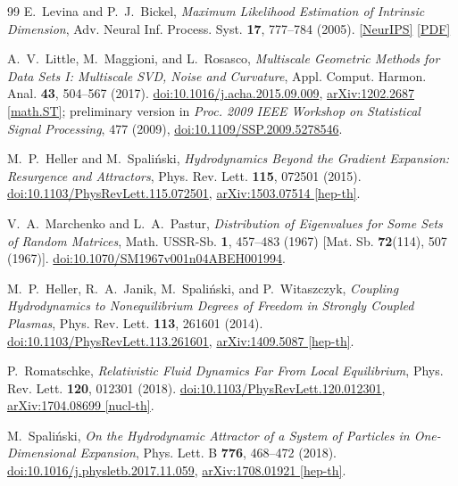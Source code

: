 \documentclass[11pt,a4paper]{article}
\begin{document}
\begin{thebibliography}{99}
E.~Levina and P.~J.~Bickel,
\emph{Maximum Likelihood Estimation of Intrinsic Dimension},
Adv. Neural Inf. Process. Syst. \textbf{17}, 777--784 (2005).
\href{https://proceedings.neurips.cc/paper_files/paper/2004/hash/74fbc16c530eb106688f1acbcb44fbee-Abstract.html}{[NeurIPS]}
\href{https://www.stat.berkeley.edu/~bickel/mldim.pdf}{[PDF]}

A.~V.~Little, M.~Maggioni, and L.~Rosasco,
\emph{Multiscale Geometric Methods for Data Sets I: Multiscale SVD, Noise and Curvature},
Appl. Comput. Harmon. Anal. \textbf{43}, 504--567 (2017).
\href{https://doi.org/10.1016/j.acha.2015.09.009}{doi:10.1016/j.acha.2015.09.009},
\href{https://arxiv.org/abs/1202.2687}{arXiv:1202.2687 [math.ST]};
preliminary version in \emph{Proc. 2009 IEEE Workshop on Statistical Signal Processing}, 477 (2009),
\href{https://doi.org/10.1109/SSP.2009.5278546}{doi:10.1109/SSP.2009.5278546}.

M.~P.~Heller and M.~Spali\'nski,
\emph{Hydrodynamics Beyond the Gradient Expansion: Resurgence and Attractors},
Phys. Rev. Lett. \textbf{115}, 072501 (2015).
\href{https://doi.org/10.1103/PhysRevLett.115.072501}{doi:10.1103/PhysRevLett.115.072501},
\href{https://arxiv.org/abs/1503.07514}{arXiv:1503.07514 [hep-th]}.

V.~A.~Marchenko and L.~A.~Pastur,
\emph{Distribution of Eigenvalues for Some Sets of Random Matrices},
Math. USSR-Sb. \textbf{1}, 457--483 (1967) [Mat. Sb. \textbf{72}(114), 507 (1967)].
\href{https://doi.org/10.1070/SM1967v001n04ABEH001994}{doi:10.1070/SM1967v001n04ABEH001994}.

M.~P.~Heller, R.~A.~Janik, M.~Spali\'nski, and P.~Witaszczyk,
\emph{Coupling Hydrodynamics to Nonequilibrium Degrees of Freedom in Strongly Coupled Plasmas},
Phys. Rev. Lett. \textbf{113}, 261601 (2014).
\href{https://doi.org/10.1103/PhysRevLett.113.261601}{doi:10.1103/PhysRevLett.113.261601},
\href{https://arxiv.org/abs/1409.5087}{arXiv:1409.5087 [hep-th]}.

P.~Romatschke,
\emph{Relativistic Fluid Dynamics Far From Local Equilibrium},
Phys. Rev. Lett. \textbf{120}, 012301 (2018).
\href{https://doi.org/10.1103/PhysRevLett.120.012301}{doi:10.1103/PhysRevLett.120.012301},
\href{https://arxiv.org/abs/1704.08699}{arXiv:1704.08699 [nucl-th]}.

M.~Spali\'nski,
\emph{On the Hydrodynamic Attractor of a System of Particles in One-Dimensional Expansion},
Phys. Lett. B \textbf{776}, 468--472 (2018).
\href{https://doi.org/10.1016/j.physletb.2017.11.059}{doi:10.1016/j.physletb.2017.11.059},
\href{https://arxiv.org/abs/1708.01921}{arXiv:1708.01921 [hep-th]}.


\end{thebibliography}
\end{document}
